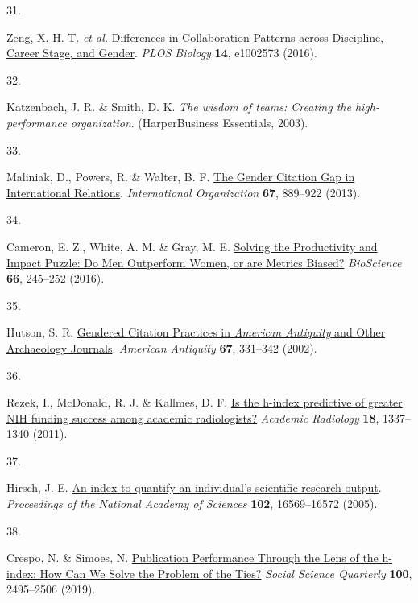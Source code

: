 \documentclass[
  man,floatsintext]{apa6}
\newlength{\cslhangindent}
\newlength{\csllabelwidth}
\newlength{\cslentryspacingunit} %
\newenvironment{CSLReferences}[2] %
 {%
  \setlength{\parindent}{0pt}
  \ifodd #1
  \let\oldpar\par
  \def\par{\hangindent=\cslhangindent\oldpar}
  \fi
  \setlength{\parskip}{#2\cslentryspacingunit}
 }%
 {}
\newcommand{\CSLLeftMargin}[1]{\parbox[t]{\csllabelwidth}{#1}}
\newcommand{\CSLRightInline}[1]{\parbox[t]{\linewidth - \csllabelwidth}{#1}\break}
\begin{document}
\begin{CSLReferences}{0}{0}
\leavevmode{}%
\CSLLeftMargin{31. }%
\CSLRightInline{Zeng, X. H. T. \emph{et al.} \href{https://doi.org/10.1371/journal.pbio.1002573}{Differences in Collaboration Patterns across Discipline, Career Stage, and Gender}. \emph{PLOS Biology} \textbf{14}, e1002573 (2016).}

\leavevmode{}%
\CSLLeftMargin{32. }%
\CSLRightInline{Katzenbach, J. R. \& Smith, D. K. \emph{The wisdom of teams: Creating the high-performance organization}. (HarperBusiness Essentials, 2003).}

\leavevmode{}%
\CSLLeftMargin{33. }%
\CSLRightInline{Maliniak, D., Powers, R. \& Walter, B. F. \href{https://doi.org/10.1017/S0020818313000209}{The Gender Citation Gap in International Relations}. \emph{International Organization} \textbf{67}, 889--922 (2013).}

\leavevmode{}%
\CSLLeftMargin{34. }%
\CSLRightInline{Cameron, E. Z., White, A. M. \& Gray, M. E. \href{https://doi.org/10.1093/biosci/biv173}{Solving the Productivity and Impact Puzzle: Do Men Outperform Women, or are Metrics Biased?} \emph{BioScience} \textbf{66}, 245--252 (2016).}

\leavevmode{}%
\CSLLeftMargin{35. }%
\CSLRightInline{Hutson, S. R. \href{https://doi.org/10.2307/2694570}{Gendered Citation Practices in {\emph{American Antiquity}} and Other Archaeology Journals}. \emph{American Antiquity} \textbf{67}, 331--342 (2002).}

\leavevmode{}%
\CSLLeftMargin{36. }%
\CSLRightInline{Rezek, I., McDonald, R. J. \& Kallmes, D. F. \href{https://doi.org/10.1016/j.acra.2011.06.017}{Is the h-index predictive of greater NIH funding success among academic radiologists?} \emph{Academic Radiology} \textbf{18}, 1337--1340 (2011).}

\leavevmode{}%
\CSLLeftMargin{37. }%
\CSLRightInline{Hirsch, J. E. \href{https://doi.org/10.1073/pnas.0507655102}{An index to quantify an individual's scientific research output}. \emph{Proceedings of the National Academy of Sciences} \textbf{102}, 16569--16572 (2005).}

\leavevmode{}%
\CSLLeftMargin{38. }%
\CSLRightInline{Crespo, N. \& Simoes, N. \href{https://doi.org/10.1111/ssqu.12696}{Publication Performance Through the Lens of the h{-}index: How Can We Solve the Problem of the Ties?} \emph{Social Science Quarterly} \textbf{100}, 2495--2506 (2019).}


\end{CSLReferences}
\end{document}
